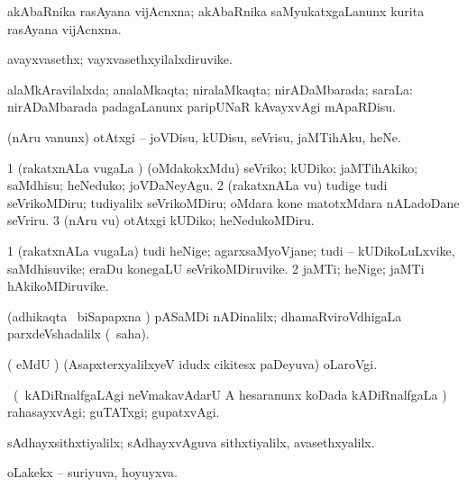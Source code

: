 \bentry
{}
\gl{\nA}
\bmng
akAbaRnika rasAyana vijAcnxna; akAbaRnika saMyukatxgaLanunx kurita rasAyana vijAcnxna. 
\emng
\eentry

\bentry
{}
\gl{\nA}
\bmng
avayxvasethx; vayxvasethxyilalxdiruvike. 
\emng
\eentry

\bentry
{}
\gl{\gu}
\bmng
alaMkAravilalxda; analaMkaqta; niralaMkaqta; nirADaMbarada; saraLa:  nirADaMbarada padagaLanunx paripUNaR kAvayxvAgi mApaRDisu. 
\emng
\eentry

\bentry
{}
\gl{\sakirx}
\bmng
(nAru \mo vanunx) otAtxgi -- joVDisu, kUDisu, seVrisu, jaMTihAku, heNe. 
\emng

\noindent 
\gl{\akirx}
\bmng
\bnum
\num{1} (rakatxnALa \mo vugaLa \vi) (oMdakokxMdu) seVriko; kUDiko; jaMTihAkiko; saMdhisu; heNeduko; joVDaNeyAgu. 
\num{2} (rakatxnALa \mo vu) tudige tudi seVrikoMDiru; tudiyalilx seVrikoMDiru; oMdara kone matotxMdara nALadoDane seVriru. 
\num{3} (nAru \mo vu) otAtxgi kUDiko; heNedukoMDiru. 
\enum
\emng
\eentry

\bentry
{}
\gl{\nA}
\bmng
\bnum
\num{1} (rakatxnALa \mo vugaLa) tudi heNige; agarxsaMyoVjane; tudi -- kUDikoLuLxvike, saMdhisuvike; eraDu konegaLU seVrikoMDiruvike. 
\num{2} jaMTi; heNige; jaMTi hAkikoMDiruvike. 
\enum
\emng
\eentry

\bentry
{}
\gl{\kirxvi}
\expl{\Latin }
\bmng
(adhikaqta \roVkAyx\ biSapapxna \vi) pASaMDi nADinalilx; dhamaRviroVdhigaLa parxdeVshadalilx (\rUpa\ saha). 
\emng
\eentry

\bentry
{}
\gl{\nA}
\bmng
( eMdU \parx) (AsapxterxyalilxyeV idudx cikitesx paDeyuva) oLaroVgi. 
\emng
\eentry

\bentry
{}
\gl{\kirxvi}
\bmng
\It\ (\kanmu\ kADiRnalfgaLAgi neVmakavAdarU A hesaranunx koDada kADiRnalfgaLa \vi) rahasayxvAgi; guTATxgi; gupatxvAgi. 
\emng
\eentry

\bentry
{}
\gl{\gu}
\expl{\Latin }
\bmng
sAdhayxsithxtiyalilx; sAdhayxvAguva sithxtiyalilx, avasethxyalilx. 
\emng
\eentry

\bentry
{}
\gl{\gu}
\bmng
oLakekx -- suriyuva, hoyuyxva. 
\emng
\eentry

